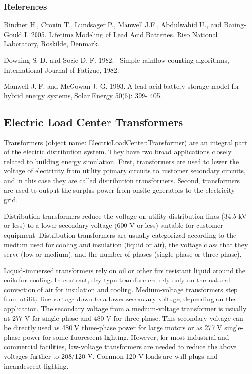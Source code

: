 \subsubsection{References}\label{references-021}

Bindner H., Cronin T., Lundsager P., Manwell J.F., Abdulwahid U., and Baring-Gould I. 2005. Lifetime Modeling of Lead Acid Batteries. Riso National Laboratory, Roskilde, Denmark.

Downing S. D. and Socie D. F. 1982.~ Simple rainflow counting algorithms, International Journal of Fatigue, 1982.

Manwell J. F. and McGowan J. G. 1993. A lead acid battery storage model for hybrid energy systems, Solar Energy 50(5): 399- 405.

\subsection{Electric Load Center Transformers}\label{electric-load-center-transformers}

Transformers (object name: ElectricLoadCenter:Transformer) are an integral part of the electric distribution system. They have two broad applications closely related to building energy simulation. First, transformers are used to lower the voltage of electricity from utility primary circuits to customer secondary circuits, and in this case they are called distribution transformers. Second, transformers are used to output the surplus power from onsite generators to the electricity grid.

Distribution transformers reduce the voltage on utility distribution lines (34.5 kV or less) to a lower secondary voltage (600 V or less) suitable for customer equipment. Distribution transformers are usually categorized according to the medium used for cooling and insulation (liquid or air), the voltage class that they serve (low or medium), and the number of phases (single phase or three phase).

Liquid-immersed transformers rely on oil or other fire resistant liquid around the coils for cooling. In contrast, dry type transformers rely only on the natural convection of air for insulation and cooling. Medium-voltage transformers step from utility line voltage down to a lower secondary voltage, depending on the application. The secondary voltage from a medium-voltage transformer is usually at 277 V for single phase and 480 V for three phase. This secondary voltage can be directly used as 480 V three-phase power for large motors or as 277 V single-phase power for some fluorescent lighting. However, for most industrial and commercial facilities, low-voltage transformers are needed to reduce the above voltages further to 208/120 V. Common 120 V loads are wall plugs and incandescent lighting.

